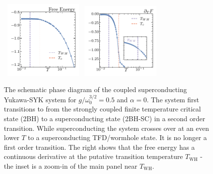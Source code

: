 \begin{figure}[t!]
    \centering
    ~\includegraphics[width=0.35\textwidth]{figures/chapter3/SUP_free_energy.pdf}
    ~\includegraphics[width=0.35\textwidth]{figures/chapter3/partialTFSUP.pdf}
    \caption{The schematic phase diagram of the coupled superconducting Yukawa-SYK system for $g/\omega_0^{3/2}=0.5$ and $\alpha=0$. The system first transitions to from the strongly coupled finite temperature critical state (2BH) to a superconducting state (2BH-SC) in a second order transition. While superconducting the system 
    crosses over at an even lower $T$ to a superconducting TFD/wormhole state. It is no longer a first order transition.  The right shows that the free energy  has a continuous derivative at the putative transition temperature $T_{\text{WH}}$ - the inset is a zoom-in of the main panel near $T_{\text{WH}}$. 
    }
    \label{fig:FreeEnergySupCondState}
\end{figure}

